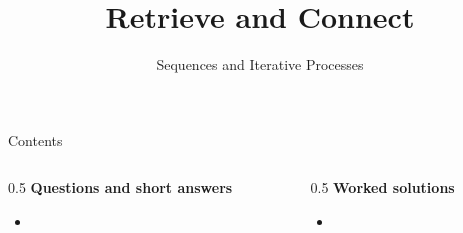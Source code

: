 \documentclass{beamer}
\title{Retrieve and Connect}
\subtitle{Sequences and Iterative Processes}
\begin{document}
\frame{\titlepage}

\begin{frame}{Contents}
\small
\begin{columns}[T]
\begin{column}{0.5\textwidth}
\textbf{Questions and short answers}
\begin{itemize}
\item \hyperlink{q-st1}{}
\end{itemize}
\end{column}
\begin{column}{0.5\textwidth}
\textbf{Worked solutions}
\begin{itemize}
\item \hyperlink{work-st1}{}
\end{itemize}
\end{column}
\end{columns}
\end{frame}
\end{document}
